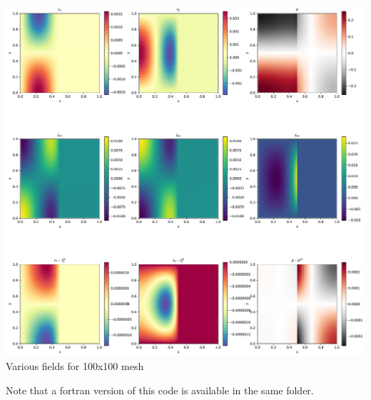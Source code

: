 \begin{center}
\includegraphics[width=16cm]{python_codes/fieldstone_05/results/solution.pdf}
{\captionfont Various fields for 100x100 mesh}
\end{center}

Note that a fortran version of this code is available in the same folder.


